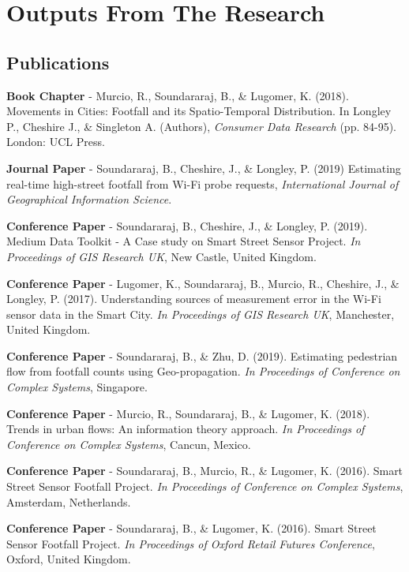
\chapter*{Outputs From The Research} \label{front:outputs}

\section*{Publications}
\textbf{Book Chapter} - Murcio, R., Soundararaj, B., \& Lugomer, K. (2018). Movements in Cities: Footfall and its Spatio-Temporal Distribution. In Longley P., Cheshire J., \& Singleton A. (Authors), \textit{Consumer Data Research} (pp. 84-95). London: UCL Press.
\vspace{0.2cm} \par \noindent \textbf{Journal Paper} - Soundararaj, B., Cheshire, J., \& Longley, P. (2019) Estimating real-time high-street footfall from Wi-Fi probe requests, \textit{International Journal of Geographical Information Science}.
\vspace{0.2cm} \par \noindent \textbf{Conference Paper} - Soundararaj, B., Cheshire, J., \& Longley, P. (2019). Medium Data Toolkit - A Case study on Smart Street Sensor Project. \textit{In Proceedings of GIS Research UK}, New Castle, United Kingdom.
\vspace{0.2cm} \par \noindent \textbf{Conference Paper} - Lugomer, K., Soundararaj, B., Murcio, R., Cheshire, J., \& Longley, P. (2017). Understanding sources of measurement error in the Wi-Fi sensor data in the Smart City. \textit{In Proceedings of GIS Research UK}, Manchester, United Kingdom.
\vspace{0.2cm} \par \noindent \textbf{Conference Paper} - Soundararaj, B., \& Zhu, D. (2019). Estimating pedestrian flow from footfall counts using Geo-propagation. \textit{In Proceedings of Conference on Complex Systems}, Singapore.
\vspace{0.2cm} \par \noindent \textbf{Conference Paper} - Murcio, R., Soundararaj, B., \& Lugomer, K. (2018). Trends in urban flows: An information theory approach. \textit{In Proceedings of Conference on Complex Systems}, Cancun, Mexico.
\vspace{0.2cm} \par \noindent \textbf{Conference Paper} - Soundararaj, B., Murcio, R., \& Lugomer, K. (2016). Smart Street Sensor Footfall Project. \textit{In Proceedings of Conference on Complex Systems}, Amsterdam, Netherlands.
\vspace{0.2cm} \par \noindent \textbf{Conference Paper} - Soundararaj, B., \& Lugomer, K. (2016). Smart Street Sensor Footfall Project. \textit{In Proceedings of Oxford Retail Futures Conference}, Oxford, United Kingdom.

